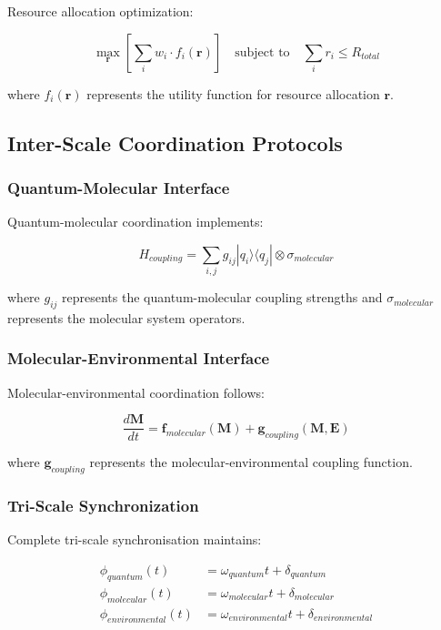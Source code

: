 \documentclass[12pt,a4paper]{article}
\begin{document}
Resource allocation optimization:

\begin{equation}
\max_{\mathbf{r}} \left[ \sum_i w_i \cdot f_i(\mathbf{r}) \right] \quad \text{subject to} \quad \sum_i r_i \leq R_{total}
\end{equation}

where $f_i(\mathbf{r})$ represents the utility function for resource allocation $\mathbf{r}$.

\subsection{Inter-Scale Coordination Protocols}

\subsubsection{Quantum-Molecular Interface}

Quantum-molecular coordination implements:

\begin{equation}
H_{coupling} = \sum_{i,j} g_{ij} |q_i\rangle\langle q_j| \otimes \sigma_{molecular}
\end{equation}

where $g_{ij}$ represents the quantum-molecular coupling strengths and $\sigma_{molecular}$ represents the molecular system operators.

\subsubsection{Molecular-Environmental Interface}

Molecular-environmental coordination follows:

\begin{equation}
\frac{d\mathbf{M}}{dt} = \mathbf{f}_{molecular}(\mathbf{M}) + \mathbf{g}_{coupling}(\mathbf{M}, \mathbf{E})
\end{equation}

where $\mathbf{g}_{coupling}$ represents the molecular-environmental coupling function.

\subsubsection{Tri-Scale Synchronization}

Complete tri-scale synchronisation maintains:

\begin{align}
\phi_{quantum}(t) &= \omega_{quantum} t + \delta_{quantum} \\
\phi_{molecular}(t) &= \omega_{molecular} t + \delta_{molecular} \\
\phi_{environmental}(t) &= \omega_{environmental} t + \delta_{environmental}
\end{align}
\end{document}
